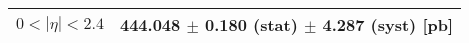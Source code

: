 \begin{tabular}{lc}
\hline
\hline
$0 < |\eta| <2.4$              & 444.048 $\pm$ 0.180 (stat) $\pm$ 4.287 (syst) [pb]  \\
\hline
\hline
\end{tabular}
